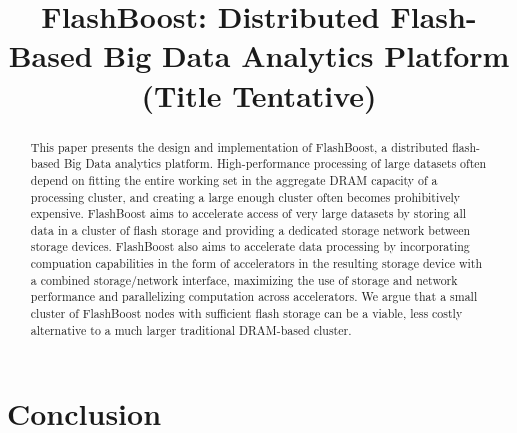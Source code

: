 \documentclass[pageno]{jpaper}
\begin{document}
\title{
FlashBoost: Distributed Flash-Based Big Data Analytics Platform
(Title Tentative)
}

\date{}
\maketitle


\begin{abstract}
This paper presents the design and implementation of FlashBoost, a distributed
flash-based Big Data analytics platform. High-performance processing of large
datasets often depend on fitting the entire working set in the aggregate DRAM
capacity of a processing cluster, and creating a large enough cluster often
becomes prohibitively expensive.  FlashBoost aims to accelerate access of very
large datasets by storing all data in a cluster of flash storage and providing a
dedicated storage network between storage devices. FlashBoost also aims to
accelerate data processing by incorporating compuation capabilities in the form
of accelerators in the resulting storage device with a combined storage/network
interface, maximizing the use of storage and network performance and
parallelizing computation across accelerators.  We argue that a small cluster of
FlashBoost nodes with sufficient flash storage can be a viable, less costly
alternative to a much larger traditional DRAM-based cluster.
\end{abstract}












\section{Conclusion}



\end{document}
